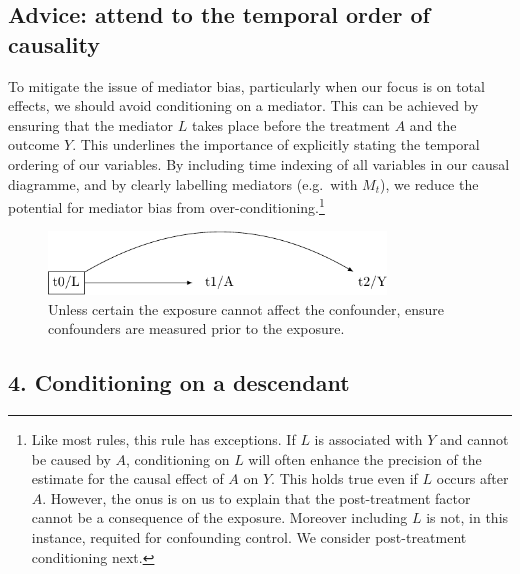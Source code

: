 \documentclass[
  singlecolumn]{report}
\begin{document}
\hypertarget{advice-attend-to-the-temporal-order-of-causality}{%
\subsection{Advice: attend to the temporal order of
causality}\label{advice-attend-to-the-temporal-order-of-causality}}

To mitigate the issue of mediator bias, particularly when our focus is
on total effects, we should avoid conditioning on a mediator. This can
be achieved by ensuring that the mediator \(L\) takes place before the
treatment \(A\) and the outcome \(Y\). This underlines the importance of
explicitly stating the temporal ordering of our variables. By including
time indexing of all variables in our causal diagramme, and by clearly
labelling mediators (e.g.~with \(M_t\)), we reduce the potential for
mediator bias from over-conditioning.\footnote{Like most rules, this
  rule has exceptions. If \(L\) is associated with \(Y\) and cannot be
  caused by \(A\), conditioning on \(L\) will often enhance the
  precision of the estimate for the causal effect of \(A\) on \(Y\).
  This holds true even if \(L\) occurs after \(A\). However, the onus is
  on us to explain that the post-treatment factor cannot be a
  consequence of the exposure. Moreover including \(L\) is not, in this
  instance, requited for confounding control. We consider post-treatment
  conditioning next.}

\begin{figure}

{\centering \includegraphics[width=0.8\textwidth,height=\textheight]{causal-dags_files/figure-pdf/fig-dag-mediator-solution-1.pdf}

}

\caption{\label{fig-dag-mediator-solution}Unless certain the exposure
cannot affect the confounder, ensure confounders are measured prior to
the exposure.}

\end{figure}

\hypertarget{conditioning-on-a-descendant}{%
\subsection{4. Conditioning on a
descendant}\label{conditioning-on-a-descendant}}
\end{document}
